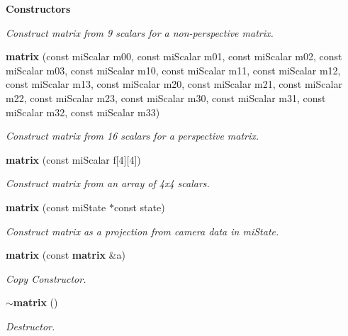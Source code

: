 \begin{Indent}{\bf Constructors}
\begin{CompactItemize}
\begin{CompactList}\small\item\em Construct matrix from 9 scalars for a non-perspective matrix. \item\end{CompactList}\item 
{\bf matrix} (const mi\-Scalar m00, const mi\-Scalar m01, const mi\-Scalar m02, const mi\-Scalar m03, const mi\-Scalar m10, const mi\-Scalar m11, const mi\-Scalar m12, const mi\-Scalar m13, const mi\-Scalar m20, const mi\-Scalar m21, const mi\-Scalar m22, const mi\-Scalar m23, const mi\-Scalar m30, const mi\-Scalar m31, const mi\-Scalar m32, const mi\-Scalar m33)
\begin{CompactList}\small\item\em Construct matrix from 16 scalars for a perspective matrix. \item\end{CompactList}\item 
{\bf matrix} (const mi\-Scalar f[4][4])
\begin{CompactList}\small\item\em Construct matrix from an array of 4x4 scalars. \item\end{CompactList}\item 
{\bf matrix} (const mi\-State $\ast$const state)
\begin{CompactList}\small\item\em Construct matrix as a projection from camera data in mi\-State. \item\end{CompactList}\item 
{\bf matrix} (const {\bf matrix} \&a)
\begin{CompactList}\small\item\em Copy Constructor. \item\end{CompactList}\item 
{\bf $\sim$matrix} ()
\begin{CompactList}\small\item\em Destructor. \item\end{CompactList}\end{CompactItemize}
\end{Indent}
